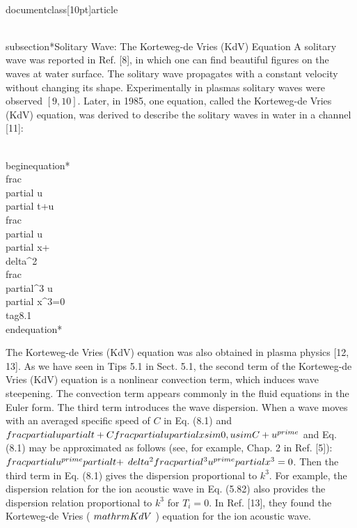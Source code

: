 \\documentclass[10pt]{article}
\begin{document}
{{{{\\subsection*{Solitary Wave: The Korteweg-de Vries (KdV) Equation}
A solitary wave was reported in Ref. [8], in which one can find beautiful figures on the waves at water surface. The solitary wave propagates with a constant velocity without changing its shape. Experimentally in plasmas solitary waves were observed $[9,10]$. Later, in 1985, one equation, called the Korteweg-de Vries (KdV) equation, was derived to describe the solitary waves in water in a channel [11]:


\\begin{equation*}
\\frac{\\partial u}{\\partial t}+u \\frac{\\partial u}{\\partial x}+\\delta^{2} \\frac{\\partial^{3} u}{\\partial x^{3}}=0 \\tag{8.1}
\\end{equation*}


The Korteweg-de Vries (KdV) equation was also obtained in plasma physics [12, 13]. As we have seen in Tips 5.1 in Sect. 5.1, the second term of the Korteweg-de Vries (KdV) equation is a nonlinear convection term, which induces wave steepening. The convection term appears commonly in the fluid equations in the Euler form. The third term introduces the wave dispersion. When a wave moves with an averaged specific speed of $C$ in Eq. (8.1) and $\\frac{\\partial u}{\\partial t}+C \\frac{\\partial u}{\\partial x} \\sim 0, u \\sim C+u^{\\prime}$ and Eq. (8.1) may be approximated as follows (see, for example, Chap. 2 in Ref. [5]): $\\frac{\\partial u^{\\prime}}{\\partial t}+$ $\\delta^{2} \\frac{\\partial^{3} u^{\\prime}}{\\partial x^{3}}=0$. Then the third term in Eq. (8.1) gives the dispersion proportional to $k^{3}$. For example, the dispersion relation for the ion acoustic wave in Eq. (5.82) also provides the dispersion relation proportional to $k^{3}$ for $T_{i}=0$. In Ref. [13], they found the Korteweg-de Vries ( $\\mathrm{KdV}$ ) equation for the ion acoustic wave.

}}}}
\end{document}
